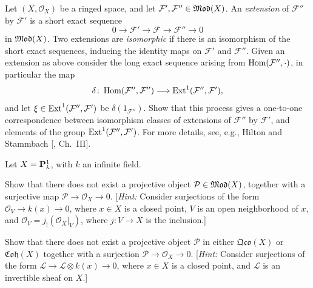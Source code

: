 {\Exercises
{\fontsize{9}{10.4}\selectfont\setlength{\parskip}{0pt}
\begin{description}[style=multiline,labelwidth=1.82em,leftmargin=2.15em,itemsep=4pt,topsep=0pt,parsep=0pt]
\item[\hypertarget{ex-III-6.1}{}6.1.] Let $(X,\mathcal O_X)$ be a ringed space, and let $\mathcal F',\mathcal F''\in\operatorname{\mathfrak{Mod}}(X)$. An \emph{extension} of $\mathcal F''$ by $\mathcal F'$ is a short exact sequence
\[
0\longrightarrow\mathcal F'\longrightarrow\mathcal F\longrightarrow\mathcal F''\longrightarrow0
\]
in $\operatorname{\mathfrak{Mod}}(X)$. Two extensions are \emph{isomorphic} if there is an isomorphism of the short exact sequences, inducing the identity maps on $\mathcal F'$ and $\mathcal F''$. Given an extension as above consider the long exact sequence arising from $\operatorname{Hom}(\mathcal F'',\cdot)$, in particular the map
\[
\delta\colon\operatorname{Hom}(\mathcal F'',\mathcal F'')\longrightarrow\operatorname{Ext}^1(\mathcal F'',\mathcal F'),
\]
and let $\xi\in\operatorname{Ext}^1(\mathcal F'',\mathcal F')$ be $\delta(1_{\mathcal F''})$. Show that this process gives a one-to-one correspondence between isomorphism classes of extensions of $\mathcal F''$ by $\mathcal F'$, and elements of the group $\operatorname{Ext}^1(\mathcal F'',\mathcal F')$. For more details, see, e.g., Hilton and Stammbach [, Ch.~III].
\item[\hypertarget{ex-III-6.2}{}6.2.] Let $X=\mathbf{P}_k^1$, with $k$ an infinite field.
\begin{parts}
\item Show that there does not exist a projective object $\mathcal P\in\operatorname{\mathfrak{Mod}}(X)$, together with a surjective map $\mathcal P\to\mathcal O_X\to0$. [\emph{Hint:} Consider surjections of the form $\mathcal O_V\to k(x)\to0$, where $x\in X$ is a closed point, $V$ is an open neighborhood of $x$, and $\mathcal O_V=j_!(\mathcal O_X|_V)$, where $j\colon V\to X$ is the inclusion.]
\item Show that there does not exist a projective object $\mathcal P$ in either $\mathfrak{Qco}(X)$ or $\mathfrak{Coh}(X)$ together with a surjection $\mathcal P\to\mathcal O_X\to0$. [\emph{Hint:} Consider surjections of the form $\mathcal L\to\mathcal L\otimes k(x)\to0$, where $x\in X$ is a closed point, and $\mathcal L$ is an invertible sheaf on $X$.]
\end{parts}
\end{description}
}
}

